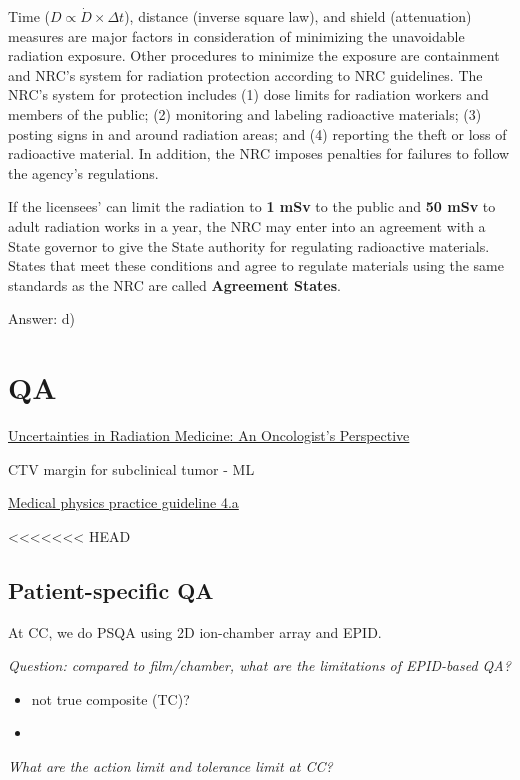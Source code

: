 \documentclass[]{book}
\theoremstyle{definition}
\theoremstyle{definition}
\theoremstyle{definition}
\theoremstyle{remark}
\begin{document}
Time (\(D \propto \dot{D}\times \Delta t\)), distance (inverse square
law), and shield (attenuation) measures are major factors in
consideration of minimizing the unavoidable radiation exposure. Other
procedures to minimize the exposure are containment and NRC's system for
radiation protection according to NRC guidelines. The NRC's system for
protection includes (1) dose limits for radiation workers and members of
the public; (2) monitoring and labeling radioactive materials; (3)
posting signs in and around radiation areas; and (4) reporting the theft
or loss of radioactive material. In addition, the NRC imposes penalties
for failures to follow the agency's regulations.

If the licensees' can limit the radiation to \textbf{1 mSv} to the
public and \textbf{50 mSv} to adult radiation works in a year, the NRC
may enter into an agreement with a State governor to give the State
authority for regulating radioactive materials. States that meet these
conditions and agree to regulate materials using the same standards as
the NRC are called \textbf{Agreement States}.

Answer: d)

\chapter{QA}\label{qa}

\href{https://vimeo.com/76862861}{Uncertainties in Radiation Medicine:
An Oncologist's Perspective}

CTV margin for subclinical tumor - ML

\href{https://aapm.onlinelibrary.wiley.com/doi/full/10.1120/jacmp.v16i3.5431}{Medical
physics practice guideline 4.a}

<<<<<<< HEAD
\section{Patient-specific QA}\label{patient-specific-qa}

At CC, we do PSQA using 2D ion-chamber array and EPID.

\emph{Question: compared to film/chamber, what are the limitations of
EPID-based QA?}

\begin{itemize}
\item
  not true composite (TC)?
\item
\end{itemize}

\emph{What are the action limit and tolerance limit at CC?}
\end{document}

